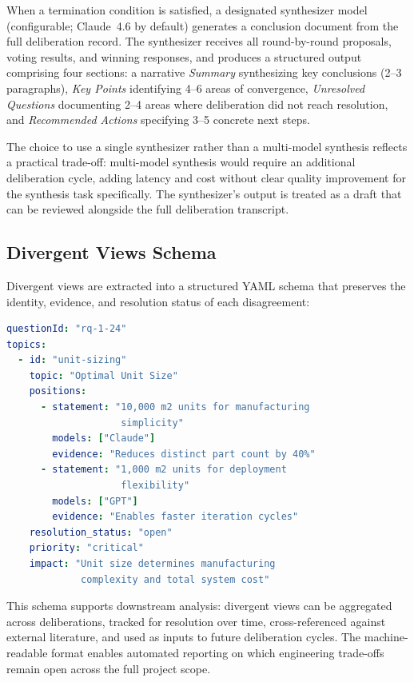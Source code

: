 \documentclass[11pt,a4paper]{article}
\begin{document}
When a termination condition is satisfied, a designated synthesizer model (configurable; Claude~4.6 by default) generates a conclusion document from the full deliberation record. The synthesizer receives all round-by-round proposals, voting results, and winning responses, and produces a structured output comprising four sections: a narrative \emph{Summary} synthesizing key conclusions (2--3 paragraphs), \emph{Key Points} identifying 4--6 areas of convergence, \emph{Unresolved Questions} documenting 2--4 areas where deliberation did not reach resolution, and \emph{Recommended Actions} specifying 3--5 concrete next steps.

The choice to use a single synthesizer rather than a multi-model synthesis reflects a practical trade-off: multi-model synthesis would require an additional deliberation cycle, adding latency and cost without clear quality improvement for the synthesis task specifically. The synthesizer's output is treated as a draft that can be reviewed alongside the full deliberation transcript.

\subsection{Divergent Views Schema}
\label{sec:divergent}

Divergent views are extracted into a structured YAML schema that preserves the identity, evidence, and resolution status of each disagreement:

\begin{lstlisting}[language=yaml,caption={Divergent views schema with model attribution.}]
questionId: "rq-1-24"
topics:
  - id: "unit-sizing"
    topic: "Optimal Unit Size"
    positions:
      - statement: "10,000 m2 units for manufacturing
                    simplicity"
        models: ["Claude"]
        evidence: "Reduces distinct part count by 40%"
      - statement: "1,000 m2 units for deployment
                    flexibility"
        models: ["GPT"]
        evidence: "Enables faster iteration cycles"
    resolution_status: "open"
    priority: "critical"
    impact: "Unit size determines manufacturing
             complexity and total system cost"
\end{lstlisting}

This schema supports downstream analysis: divergent views can be aggregated across deliberations, tracked for resolution over time, cross-referenced against external literature, and used as inputs to future deliberation cycles. The machine-readable format enables automated reporting on which engineering trade-offs remain open across the full project scope.
\end{document}
